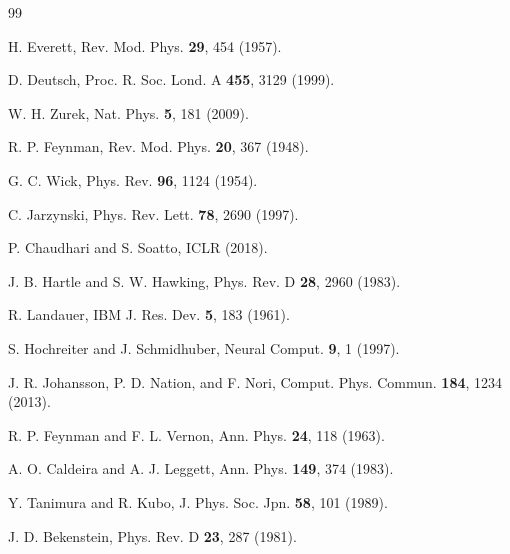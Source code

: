 \documentclass[aps,prl,twocolumn,superscriptaddress,longbibliography]{revtex4-2}
\begin{document}
\begin{thebibliography}{99}

H. Everett, Rev. Mod. Phys. \textbf{29}, 454 (1957).

D. Deutsch, Proc. R. Soc. Lond. A \textbf{455}, 3129 (1999).

W. H. Zurek, Nat. Phys. \textbf{5}, 181 (2009).

R. P. Feynman, Rev. Mod. Phys. \textbf{20}, 367 (1948).

G. C. Wick, Phys. Rev. \textbf{96}, 1124 (1954).

C. Jarzynski, Phys. Rev. Lett. \textbf{78}, 2690 (1997).

P. Chaudhari and S. Soatto, ICLR (2018).

J. B. Hartle and S. W. Hawking, Phys. Rev. D \textbf{28}, 2960 (1983).

R. Landauer, IBM J. Res. Dev. \textbf{5}, 183 (1961).

S. Hochreiter and J. Schmidhuber, Neural Comput. \textbf{9}, 1 (1997).

J. R. Johansson, P. D. Nation, and F. Nori, Comput. Phys. Commun. \textbf{184}, 1234 (2013).

R. P. Feynman and F. L. Vernon, Ann. Phys. \textbf{24}, 118 (1963).

A. O. Caldeira and A. J. Leggett, Ann. Phys. \textbf{149}, 374 (1983).

Y. Tanimura and R. Kubo, J. Phys. Soc. Jpn. \textbf{58}, 101 (1989).

J. D. Bekenstein, Phys. Rev. D \textbf{23}, 287 (1981).

\end{thebibliography}
\end{document}
